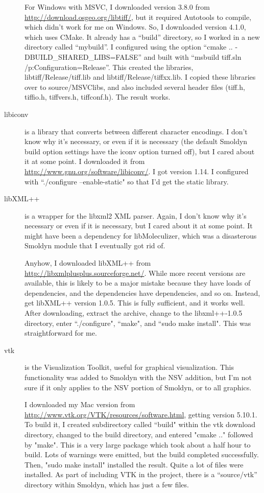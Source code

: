 \documentclass {book}
\begin{document}
\begin{description}
For Windows with MSVC, I downloaded version 3.8.0 from \url{http://download.osgeo.org/libtiff/}, but it required Autotools to compile, which didn't work for me on Windows. So, I downloaded version 4.1.0, which uses CMake. It already has a ``build'' directory, so I worked in a new directory called ``mybuild''. I configured using the option ``cmake .. -DBUILD\_SHARED\_LIBS=FALSE'' and built with ``msbuild tiff.sln /p:Configuration=Release''. This created the libraries, libtiff/Release/tiff.lib and libtiff/Release/tiffxx.lib. I copied these libraries over to source/MSVClibs, and also included several header files (tiff.h, tiffio.h, tiffvers.h, tiffconf.h). The result works.

\item[libiconv] is a library that converts between different character encodings. I don't know why it's necessary, or even if it is necessary (the default Smoldyn build option settings have the iconv option turned off), but I cared about it at some point. I downloaded it from \url{http://www.gnu.org/software/libiconv/}. I got version 1.14. I configured with ``./configure --enable-static" so that I'd get the static library.

\item[libXML++] is a wrapper for the libxml2 XML parser. Again, I don't know why it's necessary or even if it is necessary, but I cared about it at some point. It might have been a dependency for libMoleculizer, which was a disasterous Smoldyn module that I eventually got rid of.

Anyhow, I downloaded libXML++ from \url{http://libxmlplusplus.sourceforge.net/}. While more recent versions are available, this is likely to be a major mistake because they have loads of dependencies, and the dependencies have dependencies, and so on. Instead, get libXML++ version 1.0.5. This is fully sufficient, and it works well. After downloading, extract the archive, change to the libxml++-1.0.5 directory, enter ``./configure", ``make", and ``sudo make install". This was straightforward for me.

\item[vtk] is the Visualization Toolkit, useful for graphical visualization. This functionality was added to Smoldyn with the NSV addition, but I'm not sure if it only applies to the NSV portion of Smoldyn, or to all graphics.

I downloaded my Mac version from \url{http://www.vtk.org/VTK/resources/software.html}, getting version 5.10.1. To build it, I created subdirectory called ``build" within the vtk download directory, changed to the build directory, and entered "cmake .." followed by "make". This is a very large package which took about a half hour to build. Lots of warnings were emitted, but the build completed successfully. Then, "sudo make install" installed the result. Quite a lot of files were installed. As part of including VTK in the project, there is a ``source/vtk'' directory within Smoldyn, which has just a few files.


\end{description}
\end{document}
